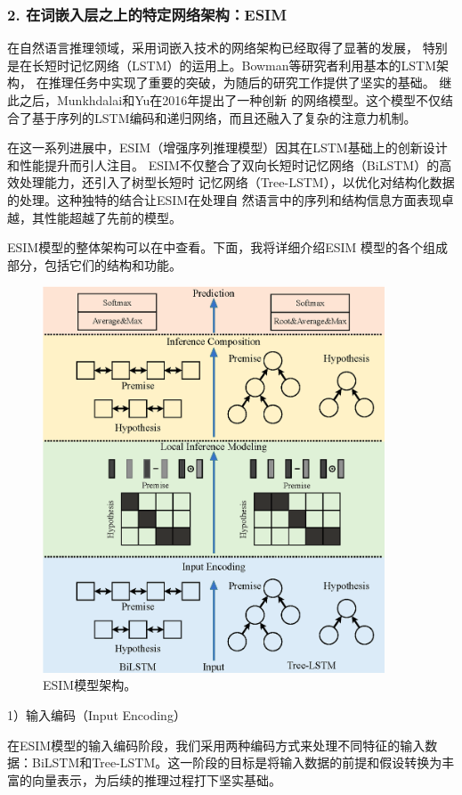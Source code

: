 \subsubsection*{2. 在词嵌入层之上的特定网络架构：ESIM}

在自然语言推理领域，采用词嵌入技术的网络架构已经取得了显著的发展，
特别是在长短时记忆网络（LSTM）的运用上。Bowman等研究者\cite{bowman2016fast}利用基本的LSTM架构，
在推理任务中实现了重要的突破，为随后的研究工作提供了坚实的基础。
继此之后，Munkhdalai和Yu在2016年\cite{munkhdalai2017neural}提出了一种创新
的网络模型。这个模型不仅结合了基于序列的LSTM编码和递归网络，而且还融入了复杂的注意力机制。

在这一系列进展中，ESIM（增强序列推理模型）因其在LSTM基础上的创新设计和性能提升而引人注目。
ESIM不仅整合了双向长短时记忆网络（BiLSTM）的高效处理能力，还引入了树型长短时
记忆网络（Tree-LSTM），以优化对结构化数据的处理。这种独特的结合让ESIM在处理自
然语言中的序列和结构信息方面表现卓越，其性能超越了先前的模型。

ESIM模型的整体架构可以在中查看。下面，我将详细介绍ESIM
模型的各个组成部分，包括它们的结构和功能。

\begin{figure}[th]
  \centering\includegraphics[width=4in]{figures/xulun/esim.eps}
  \caption{ESIM模型架构。}
  \label{fig1:esim}
  \end{figure}

1）输入编码（Input Encoding）

在ESIM模型的输入编码阶段，我们采用两种编码方式来处理不同特征的输入数据：BiLSTM和Tree-LSTM。这一阶段的目标是将输入数据的前提和假设转换为丰富的向量表示，为后续的推理过程打下坚实基础。

